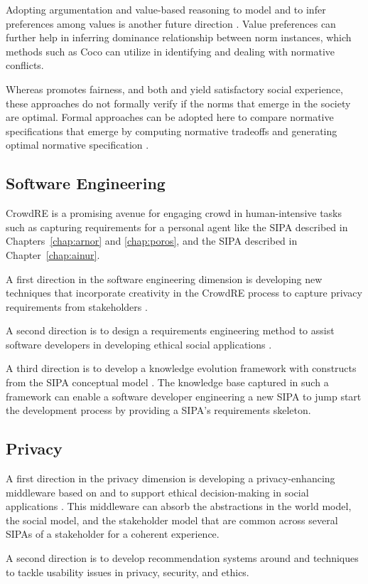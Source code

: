 Adopting argumentation and value-based reasoning to model and to infer preferences among values is another future direction \citep{Ajmeri-IJCAI16-Coco,Ajmeri-Computer17-Aragorn}.
Value preferences can further help in inferring dominance relationship between norm instances, which methods such as Coco \citep{IJCAI-16:Coco}
can utilize in identifying and dealing with normative conflicts. 

Whereas \frameworkAinur promotes fairness, and both \frameworkB and \frameworkAinur yield satisfactory social experience, these approaches do not formally verify if the norms that emerge in the society are optimal. 
Formal approaches can be adopted here to compare normative specifications that emerge by computing normative tradeoffs and generating optimal normative specification \citep{AAAI-17:Kont,Kafali-IS16-Revani}. 

\subsection{Software Engineering}
CrowdRE is a promising avenue for engaging crowd in human-intensive tasks such as capturing requirements for a personal agent like the \ringer SIPA described in Chapters~\ref{chap:arnor} and \ref{chap:poros}, and the \locationapp SIPA described in Chapter~\ref{chap:ainur}. 

A first direction in the software engineering dimension is developing new techniques that incorporate creativity in the CrowdRE process to capture privacy requirements from stakeholders \citep{Murukannaiah-RE16-Creative,Dhinakaran-RE18-ActiveAppReview}. 

A second direction is to design a requirements engineering method to assist software developers in developing ethical social applications \citep{Ajmeri-AAMAS17-Arnor,Ajmeri-IC18-Ethical}. 

A third direction is to develop a knowledge evolution framework with constructs from the SIPA conceptual model \citep{Ghaisas-2013-KRE}. The knowledge base captured in such a framework can enable a software developer engineering a new SIPA to jump start the development process by providing a SIPA's requirements skeleton. 

\subsection{Privacy}

A first direction in the privacy dimension is developing a privacy-enhancing middleware based on \frameworkB and \frameworkAinur to support ethical decision-making in social applications \citep{Ajmeri-HotSoS18-Ethics,Murukannaiah-TOSEM15-Platys}. 
This middleware can absorb the abstractions in the world model, the social model, and the stakeholder model that are common across several SIPAs of a stakeholder for a coherent experience. 

A second direction is to develop recommendation systems around \frameworkB and \frameworkAinur techniques to tackle usability issues in privacy, security, and ethics.